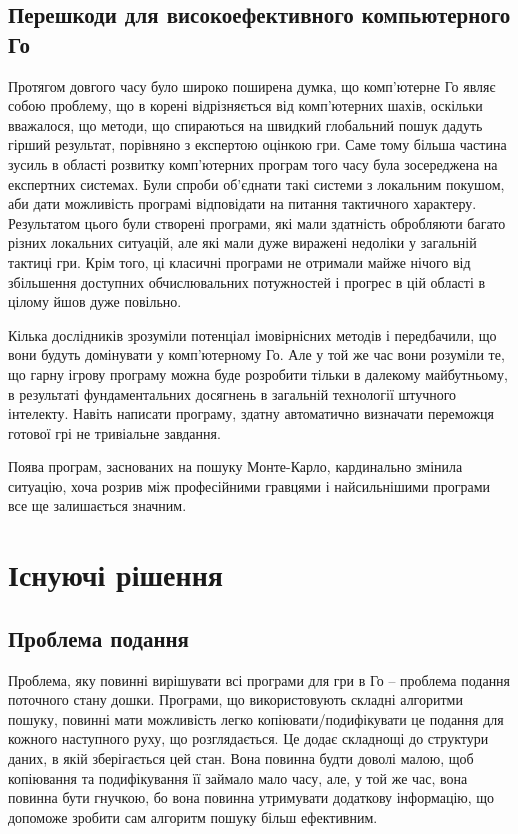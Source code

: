 \newpage
\subsection{Перешкоди для високоефективного компьютерного Го}
Протягом довгого часу було широко поширена думка, що комп'ютерне Го являє собою проблему, що в корені відрізняється від комп'ютерних шахів, оскільки вважалося, що методи, що спираються на швидкий глобальний пошук дадуть гірший результат, порівняно з експертою оцінкою гри.
Саме тому більша частина зусиль в області розвитку комп'ютерних програм того часу була зосереджена на експертних системах. Були спроби об'єднати такі системи з локальним покушом, аби дати можливість програмі відповідати на питання тактичного характеру.
Результатом цього були створені програми, які мали здатність обробляюти багато різних локальних ситуацій, але які мали дуже виражені недоліки у загальній тактиці гри.
Крім того, ці класичні програми не отримали майже нічого від збільшення доступних обчислювальних потужностей і прогрес в цій області в цілому йшов дуже повільно.

Кілька дослідників зрозуміли потенціал імовірнісних методів і передбачили, що вони будуть домінувати у комп'ютерному Го. Але у той же час вони розуміли те, що гарну ігрову програму можна буде розробити тільки в далекому майбутньому, в результаті фундаментальних досягнень в загальній технології штучного інтелекту. Навіть написати програму, здатну автоматично визначати переможця готової грі не тривіальне завдання.

Поява програм, заснованих на пошуку Монте-Карло, кардинально змінила ситуацію, хоча розрив між професійними гравцями і найсильнішими програми все ще залишається значним.

\section{Існуючі рішення}
\subsection{Проблема подання}
Проблема, яку повинні вирішувати всі програми для гри в Го -- проблема подання поточного стану дошки. Програми, що використовують складні алгоритми пошуку, повинні мати можливість легко копіювати/подифікувати це подання для кожного наступного руху, що розглядається. Це додає складнощі до структури даних, в якій зберігається цей стан. Вона повинна будти доволі малою, щоб копіювання та подифікування її займало мало часу, але, у той же час, вона повинна бути гнучкою, бо вона повинна утримувати додаткову інформацію, що допоможе зробити сам алгоритм пошуку більш ефективним.

